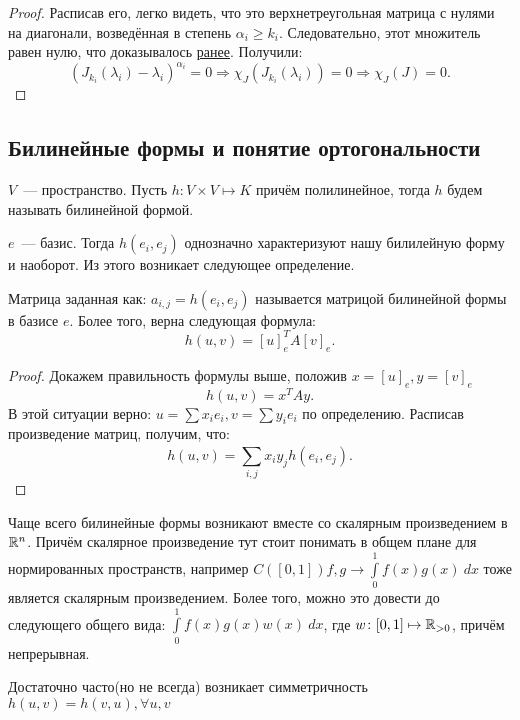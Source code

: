 \begin{proof}
    Расписав его, легко
    видеть, что это верхнетреугольная матрица с нулями на диагонали,
    возведённая в степень $\alpha_i \ge k_i$. Следовательно, этот множитель
    равен нулю, что доказывалось \hyperref[fix:nilpotent]{ранее}.
    Получили: 
    \[
        (J_{k_i}(\lambda_i) - \lambda_i)^{\alpha_i} = 0 \Rightarrow
        \chi_J(J_{k_i}(\lambda_i)) = 0 \Rightarrow
        \chi_J(J) = 0
    .\]
\end{proof}

\subsection{Билинейные формы и понятие ортогональности}
\begin{definition}
    $V$~--- пространство.
    Пусть $h\colon V \times V \mapsto K$ причём полилинейное, тогда $h$ будем называть
    билинейной формой.
\end{definition}
\begin{remark}
    $e$~--- базис.
    Тогда $h(e_i, e_j)$ однозначно характеризуют нашу билилейную форму и наоборот.
    Из этого возникает следующее определение.
\end{remark}
\begin{definition}
    Матрица заданная как: $a_{i,j} = h(e_i, e_j)$ называется матрицой билинейной формы в базисе $e$.
    Более того, верна следующая формула:
    \[
        h(u, v) = [u]^T_eA[v]_e
    .\] 
\end{definition}
\begin{proof}
Докажем правильность формулы выше, положив $x = [u]_e, y = [v]_e$
 \[
    h(u, v) = x^T A y
.\] 
В этой ситуации верно: $u = \sum x_ie_i, v = \sum y_i e_i$ по определению.
Расписав произведение матриц, получим, что:
\[
    h(u, v) = \sum\limits_{i, j}^{}{x_i y_j h(e_i, e_j)}
.\] 
\end{proof}
\begin{motivation}
    Чаще всего билинейные формы возникают вместе со скалярным произведением 
    в $\mathbb{R}^n$. Причём скалярное произведение тут стоит понимать в общем плане для
    нормированных пространств, например $C\left([0, 1]\right) f, g \rightarrow \int\limits_{0}^{1}{f(x)g(x)\ dx}$
    тоже является скалярным произведением. Более того, можно это довести до следующего
    общего вида:
    $\int\limits_{0}^{1}{f(x)g(x) w(x)\ dx}$, где $w\colon [0, 1]\mapsto \mathbb{R}_{> 0}$,
    причём непрерывная.
\end{motivation}
\begin{definition}
    \item Достаточно часто(но не всегда) возникает симметричность
        $h(u,v) = h(v,u), \forall u,v$ 
\end{definition}
